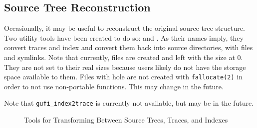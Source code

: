 \subsection{Source Tree Reconstruction}

Occasionally, it may be useful to reconstruct the original source tree
structure. Two utility tools have been created to do so: \gufitracedir
and \gufiindexdir. As their names imply, they convert traces and index
and convert them back into source directories, with files and
symlinks. Note that currently, files are created and left with the
size at 0. They are not set to their real sizes because users likely
do not have the storage space available to them. Files with hole are
not created with \texttt{fallocate(2)} in order to not use
non-portable functions. This may change in the future.

Note that \texttt{gufi\_index2trace} is currently not available, but
may be in the future.

\begin{figure}[H]
\centering
{}
\caption{Tools for Transforming Between Source Trees, Traces, and Indexes}
\end{figure}

\subsubsection{\gufitracedir}
